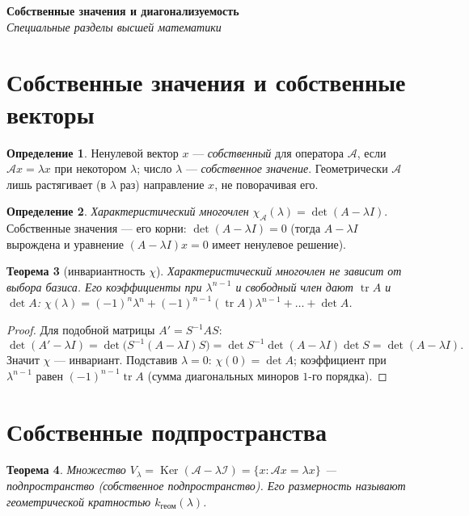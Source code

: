 \documentclass[11pt,a4paper]{article}
\newcommand{\coursename}{Специальные разделы высшей математики}
\newcommand{\doctitle}{Собственные значения и диагонализуемость}
\theoremstyle{definition}
\newtheorem{definition}{Определение}[section]
\theoremstyle{plain}
\newtheorem{theorem}[definition]{Теорема}
\DeclareMathOperator{\Ker}{Ker}
\DeclareMathOperator{\tr}{tr}
\begin{document}
\begin{center}
  {\LARGE\bfseries \doctitle}\\[4pt]
  {\large\itshape \coursename}
\end{center}
\vspace{6pt}

\section{Собственные значения и собственные векторы}

\begin{definition}
Ненулевой вектор $x$ — \emph{собственный} для оператора $\mathcal A$, если
$\mathcal Ax=\lambda x$ при некотором $\lambda$; число $\lambda$ — \emph{собственное значение}.
Геометрически $\mathcal A$ лишь растягивает (в $\lambda$ раз) направление $x$, не поворачивая его.
\end{definition}

\begin{definition}
\emph{Характеристический многочлен} $\chi_{\mathcal A}(\lambda)=\det(A-\lambda I)$. Собственные
значения — его корни: $\det(A-\lambda I)=0$ (тогда $A-\lambda I$ вырождена и уравнение
$(A-\lambda I)x=0$ имеет ненулевое решение).
\end{definition}

\begin{theorem}[инвариантность $\chi$]
Характеристический многочлен не зависит от выбора базиса. Его коэффициенты при $\lambda^{n-1}$ и
свободный член дают $\tr A$ и $\det A$: $\chi(\lambda)=(-1)^n\lambda^n+(-1)^{n-1}(\tr A)\lambda^{n-1}+\dots+\det A$.
\end{theorem}

\begin{proof}
Для подобной матрицы $A'=S^{-1}AS$:
\[
  \det(A'-\lambda I)=\det\!\bigl(S^{-1}(A-\lambda I)S\bigr)=\det S^{-1}\det(A-\lambda I)\det S=\det(A-\lambda I).
\]
Значит $\chi$ — инвариант. Подставив $\lambda=0$: $\chi(0)=\det A$; коэффициент при
$\lambda^{n-1}$ равен $(-1)^{n-1}\tr A$ (сумма диагональных миноров $1$-го порядка).
\end{proof}

\section{Собственные подпространства}

\begin{theorem}
Множество $V_\lambda=\Ker(\mathcal A-\lambda\mathcal I)=\{x:\mathcal Ax=\lambda x\}$ — подпространство
(\emph{собственное подпространство}). Его размерность называют \emph{геометрической кратностью}
$k_{\text{геом}}(\lambda)$.
\end{theorem}
\end{document}
